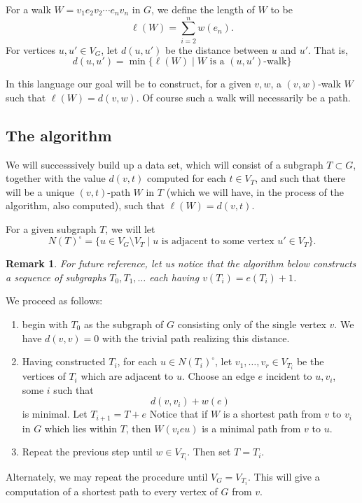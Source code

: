 \documentclass[12pt]{report}
\theoremstyle{plain}
\newtheorem{rem}[thm]{Remark}
\begin{document}
For a walk $W = v_1 e_2 v_2 \cdots e_n v_n$ in $G$, we define the length of
$W$ to be
\[\ell(W) = \sum_{i = 2}^n w(e_n).\]
For vertices $u, u' \in V_G$, let $d(u, u')$ be the distance between $u$
and $u'$. That is, 
\[d(u, u')= \min\{ \ell(W) \mid W \text{ is a $(u,u')$-walk} \}\]

In this language our goal will be to construct, for a given $v, w$, a $(v,
w)$-walk $W$ such that $\ell(W) = d(v, w)$. Of course such a walk will
necessarily be a path.

\subsection{The algorithm}

We will successsively build up a data set, which will consist of a subgraph
$T \subset G$, together with the value $d(v, t)$ computed for each $t \in
V_T$, and such that there will be a unique $(v, t)$-path $W$ in $T$ (which we
will have, in the process of the algorithm, also computed), such that $\ell(W)
= d(v, t)$.

For a given subgraph $T$, we will let
\[N(T)^\circ = \{u \in V_G \setminus V_T \mid \text{$u$ is adjacent to some
vertex $u' \in V_T$}\}.\]

\begin{rem} \label{tree degree count}
For future reference, let us notice that the algorithm below constructs a
sequence of subgraphs $T_0, T_1, \ldots$ each having $v(T_i) = e(T_i) + 1$.
\end{rem}

\noindent
We proceed as follows: 
\begin{enumerate} [ 1. ]
\item begin with $T_0$ as the subgraph of $G$ consisting
only of the single vertex $v$. We have $d(v, v) = 0$ with the trivial path
realizing this distance.
\item Having constructed $T_i$, for each $u \in N(T_i)^\circ$, let $v_1,
\ldots, v_r \in V_{T_i}$ be the vertices of $T_i$ which are adjacent to
$u$. Choose an edge $e$ incident to $u, v_i$, some $i$ such that
\[d(v, v_i) + w(e)\]
is minimal. Let $T_{i + 1} = T + e$ Notice that if $W$ is a shortest path from
$v$ to $v_i$ in $G$ which lies within $T$, then $W(v_i e u)$ is a minimal
path from $v$ to $u$.
\item Repeat the previous step until $w \in V_{T_i}$. Then set $T = T_i$.
\end{enumerate}

Alternately, we may repeat the procedure until $V_G = V_{T_i}$. This will
give a computation of a shortest path to every vertex of $G$ from $v$.
\end{document}
